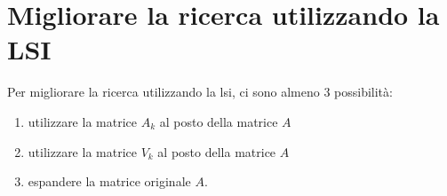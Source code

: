 \section{Migliorare la ricerca utilizzando la LSI}
Per migliorare la ricerca utilizzando la \gls{lsi}, ci sono almeno 3 possibilità:
\begin{enumerate}
    \item utilizzare la matrice $A_k$ al posto della matrice $A$
    \item utilizzare la matrice $V_k$ al posto della matrice $A$
    \item espandere la matrice originale $A$.
\end{enumerate}
